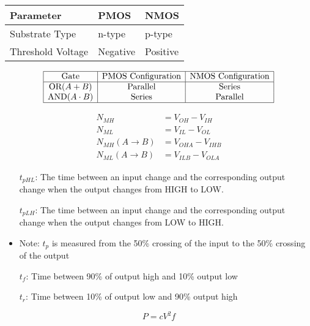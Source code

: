 \documentclass[8pt]{article}
\begin{document}
\begin{table}[h]
  \centering
  \begin{tabular}{|l|l|l|}
    \hline
    \textbf{Parameter} & \textbf{PMOS} & \textbf{NMOS} \\
    \hline
    Substrate Type     & n-type        & p-type        \\
    Threshold Voltage  & Negative      & Positive      \\
    \hline
  \end{tabular}
\end{table}

\[
  \begin{array}{|c|c|c|}
    \hline
    \text{Gate}            & \text{PMOS Configuration} & \text{NMOS Configuration} \\
    \hline
    \text{OR} (A + B)      & \text{Parallel}           & \text{Series}             \\
    \text{AND} (A \cdot B) & \text{Series}             & \text{Parallel}           \\
    \hline
  \end{array}
\]


\begin{align*}
  N_{MH}                  & = V_{OH} - V_{IH}   \\
  N_{ML}                  & = V_{IL} - V_{OL}   \\
  N_{MH}(A \rightarrow B) & = V_{OHA} - V_{IHB} \\
  N_{ML}(A \rightarrow B) & = V_{ILB} - V_{OLA}
\end{align*}

\begin{itemize}
  \item[$t_{pHL}$:] The time between an input change and the corresponding output change
        when the output changes from HIGH to LOW.
  \item[$t_{pLH}$:] The time between an input change and the corresponding output change
        when the output changes from LOW to HIGH.
  \item Note: $t_p$ is measured from the 50\% crossing
        of the input to the 50\% crossing of the output
  \item[$t_f$:] Time between 90\% of output high and 10\% output low
  \item[$t_r$:] Time between 10\% of output low and 90\% output high
\end{itemize}

\[  P = cV^2 f \]
\end{document}

